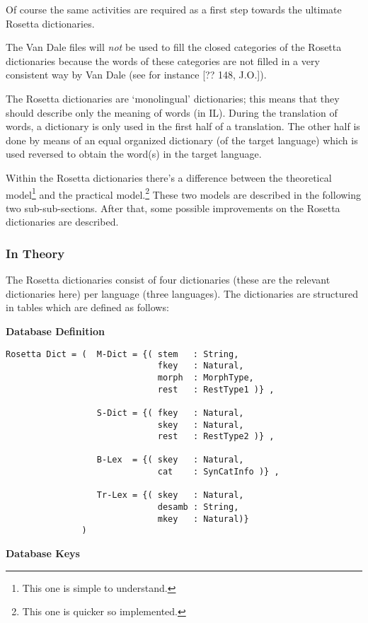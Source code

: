 Of course the same activities are required as a first step towards the 
ultimate Rosetta dictionaries.

The Van Dale files will {\em not} be used to fill the closed categories of the
Rosetta dictionaries because the words of these categories are not filled in a 
very consistent way by Van Dale (see for instance [?? 148, J.O.]).

The Rosetta dictionaries are `monolingual' dictionaries; this means that they
should describe only the meaning of words (in IL). During the translation of 
words, a dictionary is only used in the first half of a translation. The other 
half is done by means of an equal organized dictionary (of the target language)
which is used reversed to obtain the word(s) in the target language.

Within the Rosetta dictionaries there's a difference between the theoretical 
model\footnote{This one is simple to understand.} and the practical 
model.\footnote{This one is quicker so implemented.} These two models are 
described in the following two sub-sub-sections. After that, some possible 
improvements on the Rosetta dictionaries are described.

\subsubsection{In Theory}

The Rosetta dictionaries consist of four dictionaries (these are the relevant 
dictionaries here) per language (three languages). The dictionaries are 
structured in tables which are defined as follows:

{\bf Database Definition}

\begin{verbatim}
Rosetta Dict = (  M-Dict = {( stem   : String,
                              fkey   : Natural,
                              morph  : MorphType,
                              rest   : RestType1 )} ,
      
                  S-Dict = {( fkey   : Natural,
                              skey   : Natural,
                              rest   : RestType2 )} ,
      
                  B-Lex  = {( skey   : Natural,
                              cat    : SynCatInfo )} ,
          
                  Tr-Lex = {( skey   : Natural,
                              desamb : String,
                              mkey   : Natural)}
               )

\end{verbatim}
{\bf Database Keys}

